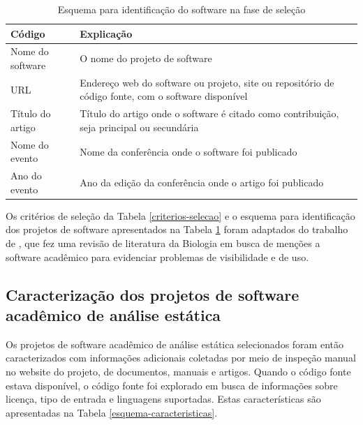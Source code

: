\begin{table}[h]
\caption{Esquema para identificação do software na fase de seleção}
\centering
\begin{tabular}{ l p{11cm} }
  \hline
  Código           & Explicação \\
  \hline
  Nome do software & O nome do projeto de software \\
  URL              & Endereço web do software ou projeto, site ou repositório de código fonte, com o software disponível \\
  Título do artigo & Título do artigo onde o software é citado como contribuição, seja principal ou secundária \\
  Nome do evento   & Nome da conferência onde o software foi publicado \\
  Ano do evento    & Ano da edição da conferência onde o artigo foi publicado \\
  \hline
\end{tabular}
\label{esquema-selecao}
\end{table}

Os critérios de seleção da Tabela \ref{criterios-selecao} e o esquema para
identificação dos projetos de software apresentados na Tabela
\ref{esquema-selecao} foram adaptados do trabalho de
, que fez uma revisão de literatura da Biologia
em busca de menções a software acadêmico para evidenciar problemas de
visibilidade e de uso.


\subsection{Caracterização dos projetos de software acadêmico de análise estática} %

Os projetos de software acadêmico de análise estática selecionados foram então
caracterizados com informações adicionais coletadas por meio de inspeção manual
no website do projeto, de documentos, manuais e artigos. Quando o código fonte
estava disponível, o código fonte foi explorado em busca de informações sobre
licença, tipo de entrada e linguagens suportadas. Estas características são apresentadas
na Tabela \ref{esquema-caracteristicas}.

